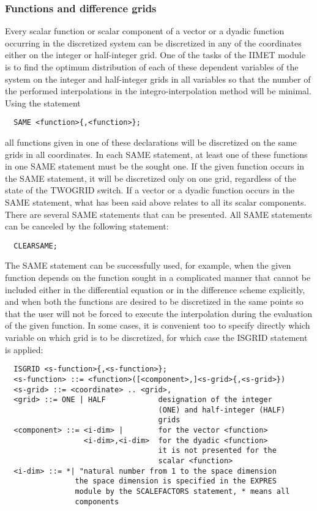 \subsubsection{Functions and difference grids}


     Every scalar function or scalar component of a  vector or  a dyadic
function occurring  in the  discretized system can be discretized in any
of the coordinates either on the  integer or  half-integer grid.  One of
the tasks  of the  IIMET module  is to  find the optimum distribution of
each of these dependent variables  of  the  system  on  the  integer and
half-integer grids  in all variables so that the number of the performed
interpolations in the integro-interpolation method will be minimal.
     Using the statement
\begin{verbatim}
  SAME <function>{,<function>};
\end{verbatim}
all functions given in one of these declarations will be  discretized on
the same  grids in all coordinates. In each SAME statement, at least one
of these functions in one SAME statement must be the sought one.  If the
given function occurs in the SAME statement, it will be discretized only
on one grid, regardless of the state of the TWOGRID switch. If  a vector
or a  dyadic function  occurs in  the SAME statement, what has been said
above relates to all  its  scalar  components.  There  are  several SAME
statements that can be presented. All SAME statements can be canceled by
the following statement:
\begin{verbatim}
  CLEARSAME;
\end{verbatim}
The SAME statement can be successfully used, for example, when the given
function depends  on the  function sought  in a  complicated manner that
cannot be  included  either  in  the  differential  equation  or  in the
difference scheme explicitly, and when both the functions are desired to
be discretized in the same points so that the user will not be forced to
execute the interpolation during the evaluation of the given function.
     In  some  cases,  it  is  convenient  too to specify directly which
variable on which grid is to be discretized,  for which  case the ISGRID
statement is applied:
\begin{verbatim}
  ISGRID <s-function>{,<s-function>};
  <s-function> ::= <function>([<component>,]<s-grid>{,<s-grid>})
  <s-grid> ::= <coordinate> .. <grid>,
  <grid> ::= ONE | HALF            designation of the integer
                                   (ONE) and half-integer (HALF)
                                   grids
  <component> ::= <i-dim> |        for the vector <function>
                  <i-dim>,<i-dim>  for the dyadic <function>
                                   it is not presented for the
                                   scalar <function>
  <i-dim> ::= *| "natural number from 1 to the space dimension
                the space dimension is specified in the EXPRES
                module by the SCALEFACTORS statement, * means all
                components
\end{verbatim}
